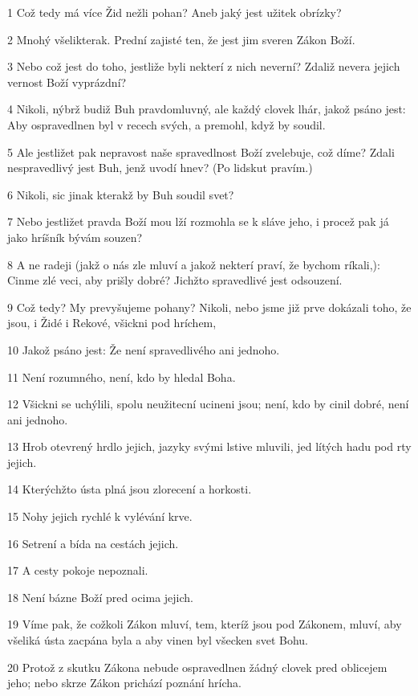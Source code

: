 \par 1 Což tedy má více Žid nežli pohan? Aneb jaký jest užitek obrízky?
\par 2 Mnohý všelikterak. Prední zajisté ten, že jest jim sveren Zákon Boží.
\par 3 Nebo což jest do toho, jestliže byli nekterí z nich neverní? Zdaliž nevera jejich vernost Boží vyprázdní?
\par 4 Nikoli, nýbrž budiž Buh pravdomluvný, ale každý clovek lhár, jakož psáno jest: Aby ospravedlnen byl v recech svých, a premohl, když by soudil.
\par 5 Ale jestližet pak nepravost naše spravedlnost Boží zvelebuje, což díme? Zdali nespravedlivý jest Buh, jenž uvodí hnev? (Po lidskut pravím.)
\par 6 Nikoli, sic jinak kterakž by Buh soudil svet?
\par 7 Nebo jestližet pravda Boží mou lží rozmohla se k sláve jeho, i procež pak já jako hríšník bývám souzen?
\par 8 A ne radeji (jakž o nás zle mluví a jakož nekterí praví, že bychom ríkali,): Cinme zlé veci, aby prišly dobré? Jichžto spravedlivé jest odsouzení.
\par 9 Což tedy? My prevyšujeme pohany? Nikoli, nebo jsme již prve dokázali toho, že jsou, i Židé i Rekové, všickni pod hríchem,
\par 10 Jakož psáno jest: Že není spravedlivého ani jednoho.
\par 11 Není rozumného, není, kdo by hledal Boha.
\par 12 Všickni se uchýlili, spolu neužitecní ucineni jsou; není, kdo by cinil dobré, není ani jednoho.
\par 13 Hrob otevrený hrdlo jejich, jazyky svými lstive mluvili, jed lítých hadu pod rty jejich.
\par 14 Kterýchžto ústa plná jsou zlorecení a horkosti.
\par 15 Nohy jejich rychlé k vylévání krve.
\par 16 Setrení a bída na cestách jejich.
\par 17 A cesty pokoje nepoznali.
\par 18 Není bázne Boží pred ocima jejich.
\par 19 Víme pak, že cožkoli Zákon mluví, tem, kteríž jsou pod Zákonem, mluví, aby všeliká ústa zacpána byla a aby vinen byl všecken svet Bohu.
\par 20 Protož z skutku Zákona nebude ospravedlnen žádný clovek pred oblicejem jeho; nebo skrze Zákon prichází poznání hrícha.

